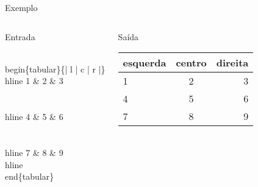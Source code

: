 \documentclass{beamer}
\begin{document}
\begin{frame}[fragile]{Exemplo}
    
    \begin{columns}
    \column{7cm}
    \begin{block}{Entrada}
        \begin{semiverbatim}
\footnotesize\\begin\{tabular\}\{| l | c | r |\}
\\hline
1 \& 2 \& 3 \\\\
\\hline
4 \& 5 \& 6 \\\\
\\hline
7 \& 8 \& 9 
\\hline
\\end\{tabular\}
\end{semiverbatim}
    \end{block}

    \begin{block}{Saída}
        \begin{tabular}{|l|c|r|}
        \hline
        esquerda & centro & direita \\
        \hline
        1 & 2 & 3 \\
        \hline
        4 & 5 & 6 \\
        \hline
        7 & 8 & 9 \\
        \hline
        \end{tabular}
    \end{block}
    \end{columns}
\end{frame}
\end{document}
